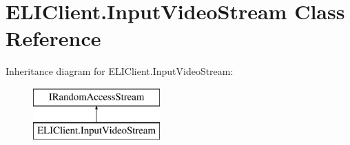 \hypertarget{class_e_l_i_client_1_1_input_video_stream}{}\section{E\+L\+I\+Client.\+Input\+Video\+Stream Class Reference}
\label{class_e_l_i_client_1_1_input_video_stream}
Inheritance diagram for E\+L\+I\+Client.\+Input\+Video\+Stream\+:\begin{figure}[H]
\begin{center}
\leavevmode
\includegraphics[height=2.000000cm]{df/d9b/class_e_l_i_client_1_1_input_video_stream}
\end{center}
\end{figure}
